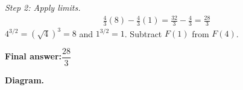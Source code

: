 \documentclass[11pt]{article}
\begin{document}
\textit{Step 2: Apply limits.}
\[\begin{gathered}
\frac{4}{3}(8) - \frac{4}{3}(1) = \frac{32}{3} - \frac{4}{3} = \frac{28}{3}
\end{gathered}\]
\( 4^{3/2} = (\sqrt{4})^3 = 8 \) and \( 1^{3/2} = 1 \). Subtract \( F(1) \) from \( F(4) \).

\begin{answerbox}
\textbf{Final answer:}\quad \(\displaystyle  \dfrac{28}{3} \)
\end{answerbox}
\textbf{Diagram.}

\begin{center}
\end{center}
\end{document}

